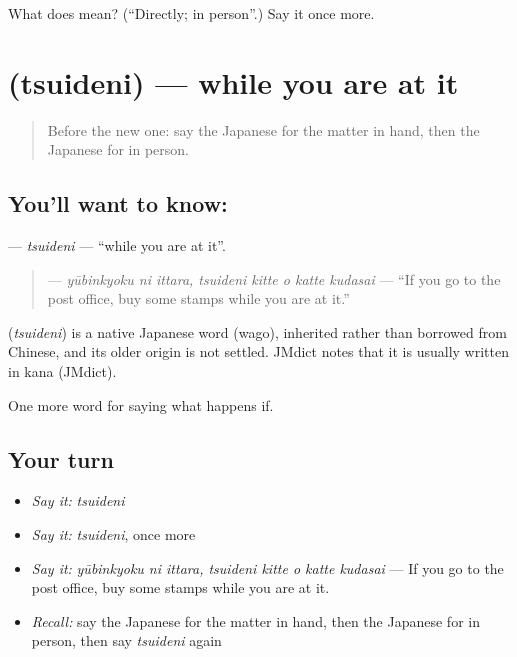\begin{tcolorbox}[breakable,colback=teal!4,colframe=teal!35!black,title={Before you move on}]
What does  mean? (\textquotedblleft{}Directly; in person\textquotedblright{}.) Say it once more.
\end{tcolorbox}
\section[\texorpdfstring{\ja{ついでに} (tsuideni)}{ついでに (tsuideni)}]{ (tsuideni) — while you are at it}

\label{lesson:JA-C347-tsuideni}



\begin{quote}
Before the new one: say the Japanese for the matter in hand, then the Japanese for in person.
\end{quote}

\subsection*{You'll want to know: }
\textbf{} — \emph{tsuideni} — \textquotedblleft{}while you are at it\textquotedblright{}.

\begin{quote}
\textbf{    } — \emph{yūbinkyoku ni ittara, tsuideni kitte o katte kudasai} — \textquotedblleft{}If you go to the post office, buy some stamps while you are at it.\textquotedblright{}
\end{quote}

\begin{cousinweb}
\textbf{} (\emph{tsuideni}) is a native Japanese word (wago), inherited rather than borrowed from Chinese, and its older origin is not settled. JMdict notes that it is usually written in kana (JMdict).
\end{cousinweb}

\begin{grammarlens}[title={What you've built}]
One more word for saying what happens if.
\end{grammarlens}

\subsection*{Your turn}
\begin{itemize}
\raggedright
  \item \emph{Say it:} \emph{tsuideni}
  \item \emph{Say it:} \emph{tsuideni}, once more
  \item \emph{Say it:} \emph{yūbinkyoku ni ittara, tsuideni kitte o katte kudasai} — If you go to the post office, buy some stamps while you are at it.
  \item \emph{Recall:} say the Japanese for the matter in hand, then the Japanese for in person, then say \emph{tsuideni} again
\end{itemize}

